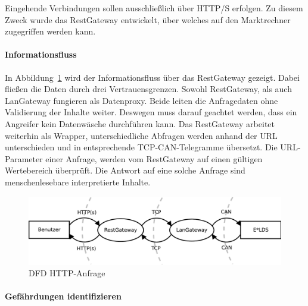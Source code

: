 \documentclass[11pt,a4paper]{report}
\begin{document}
Eingehende Verbindungen sollen ausschließlich über HTTP/S erfolgen. Zu diesem Zweck wurde das RestGateway entwickelt, über welches auf den Marktrechner zugegriffen werden kann. 

\paragraph{Informationsfluss}

In Abbildung~\ref{fig:dfd_http} wird der Informationsfluss über das RestGateway gezeigt. Dabei fließen die Daten durch drei Vertrauensgrenzen. Sowohl RestGateway, als auch LanGateway fungieren als Datenproxy. Beide leiten die Anfragedaten ohne Validierung der Inhalte weiter. Deswegen muss darauf geachtet werden, dass ein Angreifer kein Datenwäsche durchführen kann. Das RestGateway arbeitet weiterhin als Wrapper, unterschiedliche Abfragen werden anhand der URL unterschieden und in entsprechende TCP-CAN-Telegramme übersetzt. Die URL-Parameter einer Anfrage, werden vom RestGateway auf einen gültigen Wertebereich überprüft. Die Antwort auf eine solche Anfrage sind menschenlesebare interpretierte Inhalte.

\begin{figure}[htbp]
\centering
\includegraphics[scale=0.6]{images/dfd_http.pdf}
\caption{DFD HTTP-Anfrage}
\label{fig:dfd_http}
\end{figure}

\paragraph{Gefährdungen identifizieren}
\end{document}
